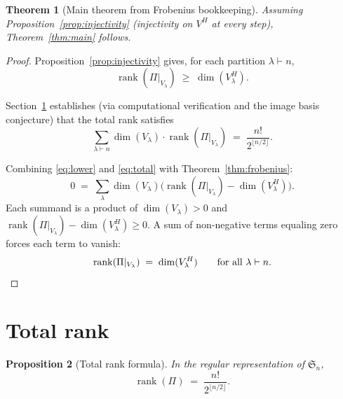 \documentclass[11pt]{article}
\newtheorem{theorem}{Theorem}[section]
\newtheorem{proposition}[theorem]{Proposition}
\theoremstyle{definition}
\theoremstyle{remark}
\newcommand{\Sym}{\mathfrak{S}}
\newcommand{\rk}{\operatorname{rank}}
\begin{document}
\begin{theorem}[Main theorem from Frobenius bookkeeping]\label{thm:main-proof}
Assuming Proposition~\ref{prop:injectivity}
(injectivity on $V^H$ at every step), Theorem~\ref{thm:main} follows.
\end{theorem}

\begin{proof}
Proposition~\ref{prop:injectivity} gives, for each partition
$\lambda \vdash n$,
\begin{equation}\label{eq:lower}
  \rk(\Pi|_{V_\lambda}) \;\ge\; \dim(V_\lambda^H).
\end{equation}

Section~\ref{sec:total-rank} establishes (via computational
verification and the image basis conjecture) that the total rank
satisfies
\begin{equation}\label{eq:total}
  \sum_{\lambda \vdash n} \dim(V_\lambda) \cdot \rk(\Pi|_{V_\lambda})
  \;=\; \frac{n!}{2^{\lfloor n/2 \rfloor}}.
\end{equation}

Combining \eqref{eq:lower} and \eqref{eq:total} with
Theorem~\ref{thm:frobenius}:
\[
  0 \;=\;
  \sum_{\lambda} \dim(V_\lambda)
  \bigl(\rk(\Pi|_{V_\lambda}) - \dim(V_\lambda^H)\bigr).
\]
Each summand is a product of $\dim(V_\lambda) > 0$ and
$\rk(\Pi|_{V_\lambda}) - \dim(V_\lambda^H) \ge 0$.
A sum of non-negative terms equaling zero forces each term to
vanish:
\[
  \rk(\Pi|_{V_\lambda}) \;=\; \dim(V_\lambda^H)
  \qquad \text{for all } \lambda \vdash n.
  \qedhere
\]
\end{proof}


\section{Total rank}\label{sec:total-rank}

\begin{proposition}[Total rank formula]\label{prop:total-rank}
In the regular representation of\/ $\Sym_n$,
\[
  \rk(\Pi) \;=\; \frac{n!}{2^{\lfloor n/2 \rfloor}}.
\]
\end{proposition}
\end{document}
